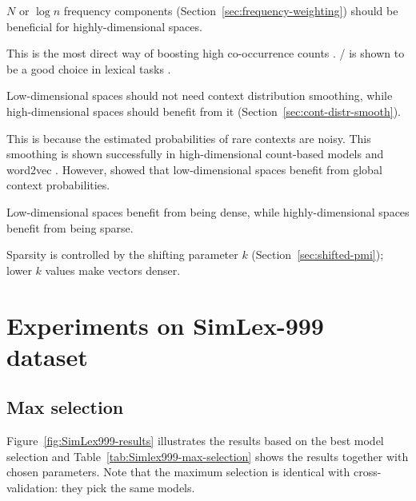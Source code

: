 \begin{hyp}
  \label{hyp:freq}
 $N$ or $\log n$ frequency components (Section~\ref{sec:frequency-weighting}) should be beneficial for highly-dimensional spaces.
\end{hyp}

This is the most direct way of boosting high co-occurrence counts \cite{Evert05}. \NPMI/ is shown to be a good choice in lexical tasks \cite{Bruni:2012:DST:2390524.2390544}.

\begin{hyp}
  \label{hyp:cds}
  Low-dimensional spaces should not need context distribution smoothing, while high-dimensional spaces should benefit from it (Section~\ref{sec:cont-distr-smooth}).
\end{hyp}

This is because the estimated probabilities of rare contexts are noisy. This smoothing is shown successfully in high-dimensional count-based models \cite{TACL570} and word2vec \cite{mikolov2013efficient}. However,  showed that low-dimensional spaces benefit from global context probabilities.

\begin{hyp}
  \label{hyp:neg}
  Low-dimensional spaces benefit from being dense, while highly-dimensional spaces benefit from being sparse.
\end{hyp}

Sparsity is controlled by the shifting parameter $k$ (Section~\ref{sec:shifted-pmi}); lower $k$ values make vectors denser.

\section{Experiments on SimLex-999 dataset}
\label{sec:simlex-999}



\subsection{Max selection}
\label{sec:max-selection-simlex}


%
%
%

Figure~\ref{fig:SimLex999-results} illustrates the results based on the best model selection and Table~\ref{tab:Simlex999-max-selection} shows the results together with chosen parameters. Note that the maximum selection is identical with cross-validation: they pick the same models.

